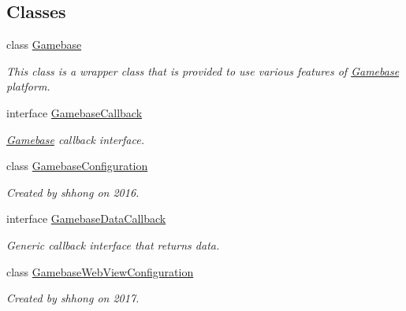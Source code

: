 \subsection*{Classes}
\begin{DoxyCompactItemize}
\item 
class \hyperlink{classcom_1_1toast_1_1android_1_1gamebase_1_1_gamebase}{Gamebase}
\begin{DoxyCompactList}\small\item\em This class is a wrapper class that is provided to use various features of \hyperlink{classcom_1_1toast_1_1android_1_1gamebase_1_1_gamebase}{Gamebase} platform. \end{DoxyCompactList}\item 
interface \hyperlink{interfacecom_1_1toast_1_1android_1_1gamebase_1_1_gamebase_callback}{Gamebase\+Callback}
\begin{DoxyCompactList}\small\item\em \hyperlink{classcom_1_1toast_1_1android_1_1gamebase_1_1_gamebase}{Gamebase} callback interface. \end{DoxyCompactList}\item 
class \hyperlink{classcom_1_1toast_1_1android_1_1gamebase_1_1_gamebase_configuration}{Gamebase\+Configuration}
\begin{DoxyCompactList}\small\item\em Created by shhong on 2016. \end{DoxyCompactList}\item 
interface \hyperlink{interfacecom_1_1toast_1_1android_1_1gamebase_1_1_gamebase_data_callback}{Gamebase\+Data\+Callback}
\begin{DoxyCompactList}\small\item\em Generic callback interface that returns data. \end{DoxyCompactList}\item 
class \hyperlink{classcom_1_1toast_1_1android_1_1gamebase_1_1_gamebase_web_view_configuration}{Gamebase\+Web\+View\+Configuration}
\begin{DoxyCompactList}\small\item\em Created by shhong on 2017. \end{DoxyCompactList}\end{DoxyCompactItemize}
